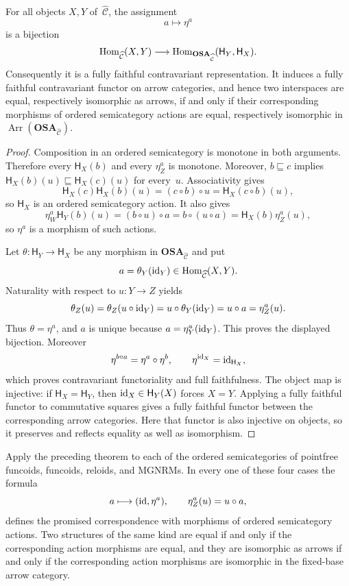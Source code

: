 \begin{thm}
For all objects $X,Y$ of~$\widehat{\mathcal C}$, the assignment
\[
a\longmapsto\eta^a
\]
is a bijection
\[
\operatorname{Hom}_{\widehat{\mathcal C}}(X,Y)
\longrightarrow
\operatorname{Hom}_{\mathbf{OSA}_{\widehat{\mathcal C}}}
   (\mathsf H_Y,\mathsf H_X).
\]
Consequently it is a fully faithful contravariant representation.
It induces a fully faithful contravariant functor on arrow categories,
and hence two interspaces are equal, respectively isomorphic as arrows,
if and only if their corresponding morphisms of ordered semicategory
actions are equal, respectively isomorphic in
$\operatorname{Arr}(\mathbf{OSA}_{\widehat{\mathcal C}})$.
\end{thm}

\begin{proof}
Composition in an ordered semicategory is monotone in both arguments.
Therefore every $\mathsf H_X(b)$ and every $\eta^a_Z$ is monotone.
Moreover, $b\sqsubseteq c$ implies
$\mathsf H_X(b)(u)\sqsubseteq\mathsf H_X(c)(u)$ for every~$u$.
Associativity gives
\[
\mathsf H_X(c)\mathsf H_X(b)(u)=(c\circ b)\circ u
 =\mathsf H_X(c\circ b)(u),
\]
so $\mathsf H_X$ is an ordered semicategory action.  It also gives
\[
\eta^a_W\mathsf H_Y(b)(u)=(b\circ u)\circ a
 =b\circ(u\circ a)=\mathsf H_X(b)\eta^a_Z(u),
\]
so $\eta^a$ is a morphism of such actions.

Let $\theta:\mathsf H_Y\to\mathsf H_X$ be any morphism in
$\mathbf{OSA}_{\widehat{\mathcal C}}$ and put
\[
a=\theta_Y({\operatorname{id}}_Y)\in\operatorname{Hom}_{\widehat{\mathcal C}}(X,Y).
\]
Naturality with respect to $u:Y\to Z$ yields
\[
\theta_Z(u)=\theta_Z(u\circ{\operatorname{id}}_Y)
 =u\circ\theta_Y({\operatorname{id}}_Y)=u\circ a=\eta^a_Z(u).
\]
Thus $\theta=\eta^a$, and $a$ is unique because
$a=\eta^a_Y({\operatorname{id}}_Y)$.  This proves the displayed bijection.  Moreover
\[
\eta^{b\circ a}=\eta^a\circ\eta^b,
\qquad
\eta^{{\operatorname{id}}_X}={\operatorname{id}}_{\mathsf H_X},
\]
which proves contravariant functoriality and full faithfulness.
The object map is injective: if $\mathsf H_X=\mathsf H_Y$, then
${\operatorname{id}}_X\in\mathsf H_Y(X)$ forces $X=Y$.
Applying a fully faithful functor to commutative squares gives a fully
faithful functor between the corresponding arrow categories. Here that
functor is also injective on objects, so it preserves and reflects
equality as well as isomorphism.
\end{proof}

\begin{cor}
Apply the preceding theorem to each of the ordered semicategories of
pointfree funcoids, funcoids, reloids, and MGNRMs.  In every one of these
four cases the formula
\[
a\longmapsto({\operatorname{id}},\eta^a),
\qquad \eta^a_Z(u)=u\circ a,
\]
defines the promised correspondence with morphisms of ordered
semicategory actions.  Two structures of the same kind are equal if and
only if the corresponding action morphisms are equal, and they are
isomorphic as arrows if and only if the corresponding action morphisms
are isomorphic in the fixed-base arrow category.
\end{cor}

